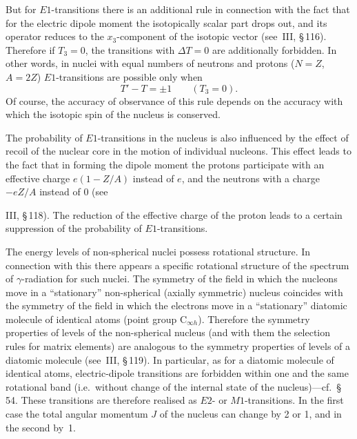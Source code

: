 But for $E1$-transitions there is an additional rule in connection with the fact that for the electric dipole moment the isotopically scalar part drops out, and its operator reduces to the $x_3$-component of the isotopic vector (see~III, \S\,116). Therefore if $T_3 = 0$, the transitions with $\Delta T = 0$ are additionally forbidden. In other words, in nuclei with equal numbers of neutrons and protons ($N = Z$, $A = 2Z$) $E1$-transitions are possible only when
\begin{equation}
T' - T = \pm 1\qquad (T_3 = 0).
\tag{55.2}
\end{equation}
Of course, the accuracy of observance of this rule depends on the accuracy with which the isotopic spin of the nucleus is conserved.

The probability of $E1$-transitions in the nucleus is also influenced by the effect of recoil of the nuclear core in the motion of individual nucleons. This effect leads to the fact that in forming the dipole moment the protons participate with an effective charge $e(1 - Z/A)$ instead of $e$, and the neutrons with a charge $-eZ/A$ instead of 0 (see~

III, \S\,118). The reduction of the effective charge of the proton leads to a certain suppression of the probability of $E1$-transitions.

The energy levels of non-spherical nuclei possess rotational structure. In connection with this there appears a specific rotational structure of the spectrum of $\gamma$-radiation for such nuclei. The symmetry of the field in which the nucleons move in a ``stationary'' non-spherical (axially symmetric) nucleus coincides with the symmetry of the field in which the electrons move in a ``stationary'' diatomic molecule of identical atoms (point group $\mathrm{C}_{\infty h}$). Therefore the symmetry properties of levels of the non-spherical nucleus (and with them the selection rules for matrix elements) are analogous to the symmetry properties of levels of a diatomic molecule (see~III, \S\,119). In particular, as for a diatomic molecule of identical atoms, electric-dipole transitions are forbidden within one and the same rotational band (i.e.\ without change of the internal state of the nucleus)---cf.~\S\,54. These transitions are therefore realised as $E2$- or $M1$-transitions. In the first case the total angular momentum $J$ of the nucleus can change by 2 or 1, and in the second by~1.

